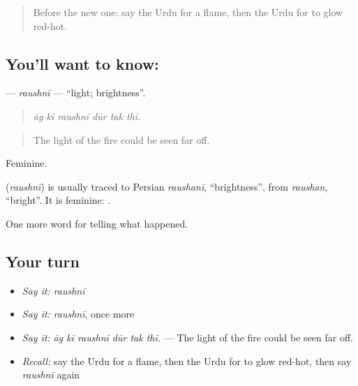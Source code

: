 \label{lesson:UR-C288-raushni}



\begin{quote}
Before the new one: say the Urdu for a flame, then the Urdu for to glow red-hot.
\end{quote}

\subsection*{You'll want to know: }
\textbf{} — \emph{raushnī} — \textquotedblleft{}light; brightness\textquotedblright{}.

\begin{quote}
     
\end{quote}

\begin{quote}
\emph{āg kī raushnī dūr tak thī.}
\end{quote}

\begin{quote}
The light of the fire could be seen far off.
\end{quote}

Feminine.

\begin{cousinweb}
\textbf{} (\emph{raushnī}) is usually traced to Persian \emph{raushanī}, \textquotedblleft{}brightness\textquotedblright{}, from \emph{raushan}, \textquotedblleft{}bright\textquotedblright{}. It is feminine: \textbf{ }.
\end{cousinweb}

\begin{grammarlens}[title={What you've built}]
One more word for telling what happened.
\end{grammarlens}

\subsection*{Your turn}
\begin{itemize}
\raggedright
  \item \emph{Say it:} \emph{raushnī}
  \item \emph{Say it:} \emph{raushnī}, once more
  \item \emph{Say it:} \emph{āg kī raushnī dūr tak thī.} — The light of the fire could be seen far off.
  \item \emph{Recall:} say the Urdu for a flame, then the Urdu for to glow red-hot, then say \emph{raushnī} again
\end{itemize}

